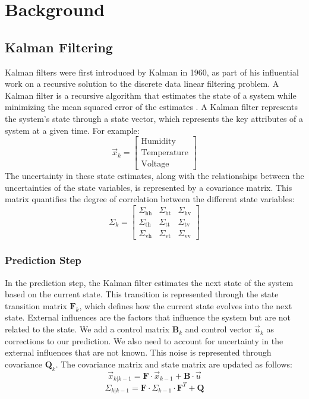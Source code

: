 \section{Background} 
\subsection{Kalman Filtering}
Kalman filters were first introduced by Kalman \cite{kalman1960filtering} in 1960, as part of his influential work on a recursive solution to the discrete data linear filtering problem. A Kalman filter is a recursive algorithm that estimates the state of a system while minimizing the mean squared error of the estimates \cite{bishop2001introduction}. A Kalman filter represents the system's state through a state vector, which represents the key attributes of a system at a given time. For example: 
\[
\vec{x}_k =
\begin{bmatrix}
\text{Humidity} \\
\text{Temperature} \\
\text{Voltage}
\end{bmatrix}
\]
The uncertainty in these state estimates, along with the relationships between the uncertainties of the state variables, is represented by a covariance matrix. This matrix quantifies the degree of correlation between the different state variables:
\[
\Sigma_k =
\begin{bmatrix}
\Sigma_{\text{hh}} & \Sigma_{\text{ht}} & \Sigma_{\text{hv}} \\
\Sigma_{\text{th}} & \Sigma_{\text{tt}} & \Sigma_{\text{tv}} \\
\Sigma_{\text{vh}} & \Sigma_{\text{vt}} & \Sigma_{\text{vv}}
\end{bmatrix}
\]

\subsubsection{Prediction Step}
In the prediction step, the Kalman filter estimates the next state of the system based on the current state. This transition is represented through the state transition matrix \( \mathbf{F}_k \), which defines how the current state evolves into the next state. External influences are the factors that influence the system but are not related to the state. We add a control matrix \( \mathbf{B}_k \) and control vector \(\vec{u}_k\) as corrections to our prediction. We also need to account for uncertainty in the external influences that are not known. This noise is represented through covariance \( \mathbf{Q}_k \). The covariance matrix and state matrix are updated as follows:
\[
\vec{x}_{k|k-1} = \mathbf{F} \cdot \vec{x}_{k-1} + \mathbf{B} \cdot \vec{u}
\]
\[
\Sigma_{k|k-1} = \mathbf{F} \cdot \Sigma_{k-1} \cdot \mathbf{F}^T + \mathbf{Q}
\]

